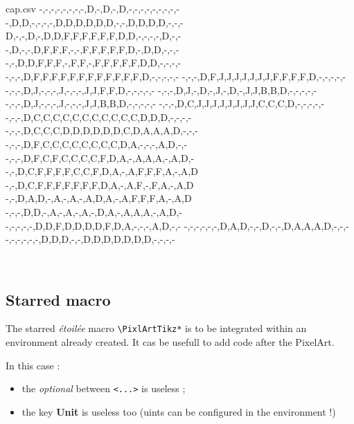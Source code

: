 \documentclass{article}
\newcommand\Cle[1]{{\bfseries\sffamily\textlangle #1\textrangle}}
\begin{document}
\begin{PresentationCode}{}

\begin{filecontents*}[overwrite]{cap.csv}
	-,-,-,-,-,-,-,-,D,-,D,-,D,-,-,-,-,-,-,-,-,-
	-,D,D,-,-,-,-,D,D,D,D,D,D,-,-,D,D,D,D,-,-,-
	D,-,-,D,-,D,D,F,F,F,F,F,F,D,D,-,-,-,-,D,-,-
	-,D,-,-,D,F,F,F,-,-,F,F,F,F,F,D,-,D,D,-,-,-
	-,-,D,D,F,F,F,-,F,F,-,F,F,F,F,F,D,D,-,-,-,-
	-,-,-,D,F,F,F,F,F,F,F,F,F,F,F,F,D,-,-,-,-,-
	-,-,-,D,F,J,J,J,J,J,J,J,F,F,F,F,D,-,-,-,-,-
	-,-,-,D,J,-,-,-,J,-,-,-,J,J,F,F,D,-,-,-,-,-
	-,-,-,D,J,-,D,-,J,-,D,-,J,J,B,B,D,-,-,-,-,-
	-,-,-,D,J,-,-,-,J,-,-,-,J,J,B,B,D,-,-,-,-,-
	-,-,-,D,C,J,J,J,J,J,J,J,J,C,C,C,D,-,-,-,-,-
	-,-,-,D,C,C,C,C,C,C,C,C,C,C,C,D,D,D,-,-,-,-
	-,-,-,D,C,C,C,D,D,D,D,D,D,C,D,A,A,A,D,-,-,-
	-,-,-,D,F,C,C,C,C,C,C,C,C,D,A,-,-,-,A,D,-,-
	-,-,-,D,F,C,F,C,C,C,C,F,D,A,-,A,A,A,-,A,D,-
	-,-,D,C,F,F,F,F,C,C,F,D,A,-,A,F,F,F,A,-,A,D
	-,-,D,C,F,F,F,F,F,F,F,D,A,-,A,F,-,F,A,-,A,D
	-,-,D,A,D,-,A,-,A,-,A,D,A,-,A,F,F,F,A,-,A,D
	-,-,-,D,D,-,A,-,A,-,A,-,D,A,-,A,A,A,-,A,D,-
	-,-,-,-,-,D,D,F,D,D,D,D,F,D,A,-,-,-,A,D,-,-
	-,-,-,-,-,-,D,A,D,-,-,D,-,-,D,A,A,A,D,-,-,-
	-,-,-,-,-,-,D,D,D,-,-,D,D,D,D,D,D,D,-,-,-,-
\end{filecontents*}

~~
\end{PresentationCode}

\pagebreak

\subsection{Starred macro}

The starred \textit{étoilée} macro \texttt{\textbackslash PixlArtTikz*} is to be integrated within an environment already created. It cas be usefull to add code after the PixelArt.

\smallskip

In this case :

\begin{itemize}
	\item the \textit{optional} between \texttt{<...>} is useless ;
	\item the key \Cle{Unit} is useless too (uints can be configured in the environment !)
\end{itemize}
\end{document}

